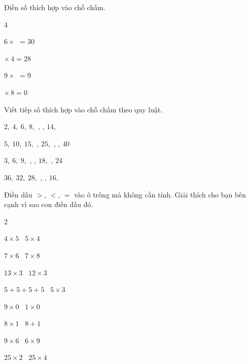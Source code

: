 \documentclass[../main.tex]{subfiles}
\begin{document}
\begin{bt}
    Điền số thích hợp vào chỗ chấm.
    \begin{multicols}{4}
    \begin{listEX}
        \item $6 \times$ \TTcham[0.9cm] $= 30$
        \item \TTcham[0.9cm] $\times\, 4 = 28$
        \item $9 \times$ \TTcham[0.9cm] $= 9$
        \item \TTcham[0.9cm] $\times\, 8 = 0$
    \end{listEX}
    \end{multicols}
\end{bt}
\begin{bt}
    Viết tiếp số thích hợp vào chỗ chấm theo quy luật.
    \begin{listEX}
        \item $2,\ 4,\ 6,\ 8,$ \TTcham[1cm], \TTcham[1cm], $14,$ \TTcham[1cm]
        \item $5,\ 10,\ 15,$ \TTcham[1cm], $25,$ \TTcham[1cm], \TTcham[1cm], $40$
        \item $3,\ 6,\ 9,$ \TTcham[1cm], \TTcham[1cm], $18,$ \TTcham[1cm], $24$
        \item $36,\ 32,\ 28,$ \TTcham[1cm], \TTcham[1cm], $16,$ \TTcham[1cm]
    \end{listEX}
\end{bt}
\begin{bt}
    Điền dấu $>$, $<$, $=$ vào ô trống mà không cần tính. Giải thích cho bạn bên cạnh vì sao con điền dấu đó.
    \begin{multicols}{2}
    \begin{listEX}
        \item $4 \times 5$ \TTo\ $5 \times 4$
        \item $7 \times 6$ \TTo\ $7 \times 8$
        \item $13 \times 3$ \TTo\ $12 \times 3$
        \item $5 + 5 + 5 + 5$ \TTo\ $5 \times 3$
        \item $9 \times 0$ \TTo\ $1 \times 0$
        \item $8 \times 1$ \TTo\ $8 + 1$
        \item $9 \times 6$ \TTo\ $6 \times 9$
        \item $25 \times 2$ \TTo\ $25 \times 4$
    \end{listEX}
    \end{multicols}
\end{bt}
\end{document}
